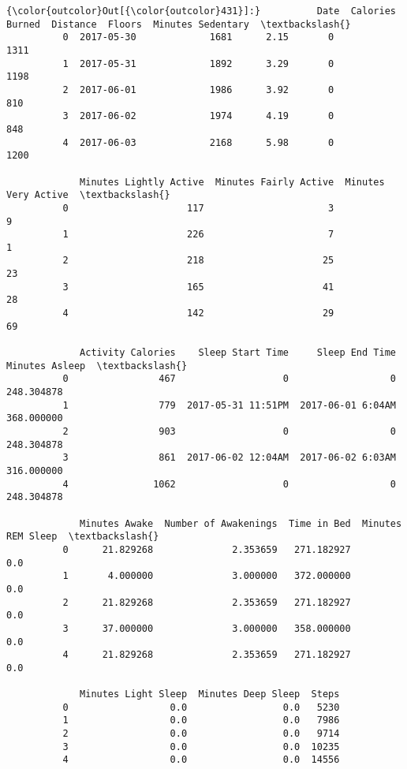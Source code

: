 \documentclass[11pt]{article}
\begin{document}
\begin{Verbatim}[commandchars=\\\{\}]
{\color{outcolor}Out[{\color{outcolor}431}]:}          Date  Calories Burned  Distance  Floors  Minutes Sedentary  \textbackslash{}
          0  2017-05-30             1681      2.15       0               1311   
          1  2017-05-31             1892      3.29       0               1198   
          2  2017-06-01             1986      3.92       0                810   
          3  2017-06-02             1974      4.19       0                848   
          4  2017-06-03             2168      5.98       0               1200   
          
             Minutes Lightly Active  Minutes Fairly Active  Minutes Very Active  \textbackslash{}
          0                     117                      3                    9   
          1                     226                      7                    1   
          2                     218                     25                   23   
          3                     165                     41                   28   
          4                     142                     29                   69   
          
             Activity Calories    Sleep Start Time     Sleep End Time  Minutes Asleep  \textbackslash{}
          0                467                   0                  0      248.304878   
          1                779  2017-05-31 11:51PM  2017-06-01 6:04AM      368.000000   
          2                903                   0                  0      248.304878   
          3                861  2017-06-02 12:04AM  2017-06-02 6:03AM      316.000000   
          4               1062                   0                  0      248.304878   
          
             Minutes Awake  Number of Awakenings  Time in Bed  Minutes REM Sleep  \textbackslash{}
          0      21.829268              2.353659   271.182927                0.0   
          1       4.000000              3.000000   372.000000                0.0   
          2      21.829268              2.353659   271.182927                0.0   
          3      37.000000              3.000000   358.000000                0.0   
          4      21.829268              2.353659   271.182927                0.0   
          
             Minutes Light Sleep  Minutes Deep Sleep  Steps  
          0                  0.0                 0.0   5230  
          1                  0.0                 0.0   7986  
          2                  0.0                 0.0   9714  
          3                  0.0                 0.0  10235  
          4                  0.0                 0.0  14556  
\end{Verbatim}
            
\end{document}
